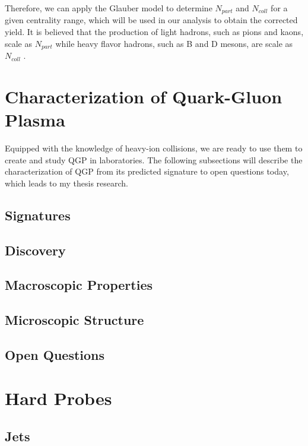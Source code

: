 Therefore, we can apply the Glauber model to determine $N_{part}$ and $N_{coll}$ for a given centrality range, which will be used in our analysis to obtain the corrected yield. It is believed that the production of light hadrons, such as pions and kaons, scale as $N_{part}$ \cite{NPartScaling} while heavy flavor hadrons, such as B and D mesons, are scale as $N_{coll}$ \cite{NCollScaling}.

\section{Characterization of Quark-Gluon Plasma}

Equipped with the knowledge of heavy-ion collisions, we are ready to use them to create and study QGP in laboratories. The following subsections will describe the characterization of QGP from its predicted signature to open questions today, which leads to my thesis research.

\subsection{Signatures}

\subsection{Discovery}

\subsection{Macroscopic Properties}

\subsection{Microscopic Structure}

\subsection{Open Questions}


\section{Hard Probes}

\subsection{Jets}

